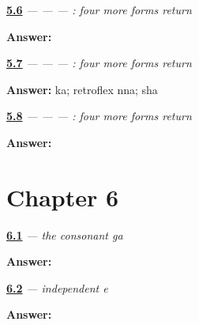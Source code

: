 \noindent\begin{minipage}[t]{\linewidth}
\raggedright
\hyperlink{review-GU-R05-second-four-r1-dictation}{\textbf{5.6}} \emph{ —  —  — : four more forms return}\par
\small \textbf{Answer:}    \par
\end{minipage}\par\medskip

\noindent\begin{minipage}[t]{\linewidth}
\raggedright
\hyperlink{review-GU-R05-second-four-r1-doorway-three-r2-reading}{\textbf{5.7}} \emph{ —  —  — : four more forms return}\par
\small \textbf{Answer:} ka; retroflex nna; sha\par
\end{minipage}\par\medskip

\noindent\begin{minipage}[t]{\linewidth}
\raggedright
\hyperlink{review-GU-R05-second-four-r1-doorway-three-r2-dictation}{\textbf{5.8}} \emph{ —  —  — : four more forms return}\par
\small \textbf{Answer:}   \par
\end{minipage}\par\medskip

\section*{Chapter 6}

\noindent\begin{minipage}[t]{\linewidth}
\raggedright
\hyperlink{review-GU-W06-ga-recall}{\textbf{6.1}} \emph{ — the consonant ga}\par
\small \textbf{Answer:} \par
\end{minipage}\par\medskip

\noindent\begin{minipage}[t]{\linewidth}
\raggedright
\hyperlink{review-GU-W06-independent-e-recall}{\textbf{6.2}} \emph{ — independent e}\par
\small \textbf{Answer:} \par
\end{minipage}\par\medskip

